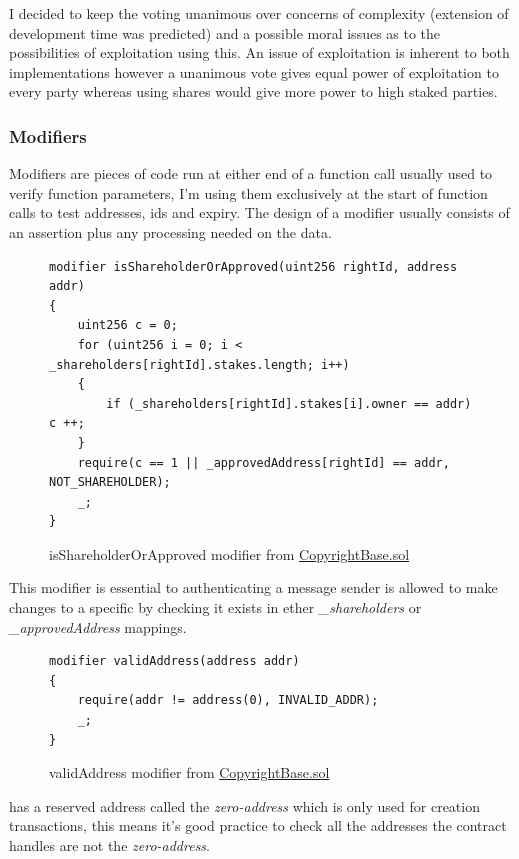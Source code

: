 I decided to keep the voting unanimous over concerns of complexity (extension of development time was predicted) and a possible moral issues as to the possibilities of exploitation using this. An issue of exploitation is inherent to both implementations however a unanimous vote gives equal power of exploitation to every party whereas using shares would give more power to high staked parties.
 

\subsubsection{Modifiers}

Modifiers are pieces of code run at either end of a function call usually used to verify function parameters, I'm using them exclusively at the start of function calls to test addresses, ids and expiry. The design of a modifier usually consists of an assertion plus any processing needed on the data. 

\begin{figure}[H]
\caption{isShareholderOrApproved modifier from \href{https://github.com/MrHarrisonBarker/CRPL/blob/main/CRPL.Contracts/contracts/Copyrights/CopyrightBase.sol}{CopyrightBase.sol}}
\centering
\begin{lstlisting}[language=Solidity]
modifier isShareholderOrApproved(uint256 rightId, address addr) 
{
	uint256 c = 0;
	for (uint256 i = 0; i < _shareholders[rightId].stakes.length; i++) 
	{
		if (_shareholders[rightId].stakes[i].owner == addr) c ++;
	}
	require(c == 1 || _approvedAddress[rightId] == addr, NOT_SHAREHOLDER);
	_;
}
\end{lstlisting}
\end{figure}

This modifier is essential to authenticating a message sender is allowed to make changes to a specific  by checking it exists in ether \textit{\_shareholders} or \textit{\_approvedAddress} mappings.

\begin{figure}[H]
\caption{validAddress modifier from \href{https://github.com/MrHarrisonBarker/CRPL/blob/main/CRPL.Contracts/contracts/Copyrights/CopyrightBase.sol}{CopyrightBase.sol}}
\centering
\begin{lstlisting}[language=Solidity]
modifier validAddress(address addr)
{
	require(addr != address(0), INVALID_ADDR);
	_;
}
\end{lstlisting}
\end{figure}

 has a reserved address called the \textit{zero-address} which is only used for  creation transactions, this means it's good practice to check all the addresses the contract handles are not the \textit{zero-address}. 

